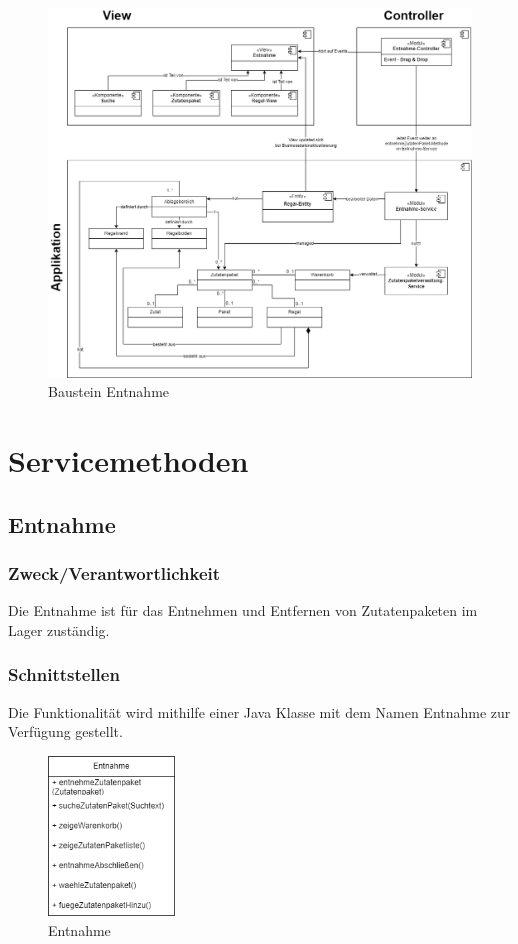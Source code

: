 \begin{figure}[H]
    \centering
    \includegraphics[width=1\textwidth]{Bilder/Kapitel/Bausteinsicht/Baustein_Entnahme}
    \caption{Baustein Entnahme}
    \label{fig:Baustein_Entnahme}
\end{figure}

\section{Servicemethoden}
\subsection{Entnahme}\label{subsec:entnahme}
\subsubsection{Zweck/Verantwortlichkeit}
Die Entnahme ist für das Entnehmen und Entfernen von Zutatenpaketen im Lager zuständig.
\subsubsection{Schnittstellen}
Die Funktionalität wird mithilfe einer Java Klasse mit dem Namen Entnahme zur Verfügung gestellt.
\begin{figure}[H]
    \centering
    \includegraphics[width=0.3\textwidth]{Bilder/Kapitel/Bausteinsicht/Entnahme}
    \caption{Entnahme}
    \label{fig:Entnahme}
\end{figure}

